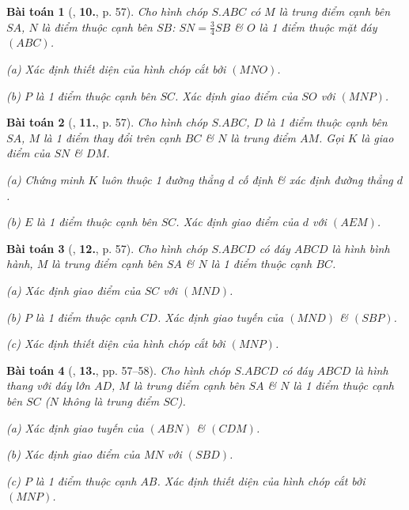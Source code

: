 \documentclass{article}
\numberwithin{equation}{section}
\newtheorem{baitoan}{Bài toán}[section]
\begin{document}
\begin{baitoan}[\cite{TL_chuyen_Toan_Hinh_Hoc_11}, \textbf{10.}, p. 57]
	Cho hình chóp $S.ABC$ có $M$ là trung điểm cạnh bên $SA$, $N$ là điểm thuộc cạnh bên $SB$: $SN = \frac{3}{4}SB$ \& $O$ là 1 điểm thuộc mặt đáy $(ABC)$.
	\begin{enumerate*}
		\item[(a)] Xác định thiết diện của hình chóp cắt bởi $(MNO)$.
		\item[(b)] $P$ là 1 điểm thuộc cạnh bên $SC$. Xác định giao điểm của $SO$ với $(MNP)$.
	\end{enumerate*}
\end{baitoan}

\begin{baitoan}[\cite{TL_chuyen_Toan_Hinh_Hoc_11}, \textbf{11.}, p. 57]
	Cho hình chóp $S.ABC$, $D$ là 1 điểm thuộc cạnh bên $SA$, $M$ là 1 điểm thay đổi trên cạnh $BC$ \& $N$ là trung điểm $AM$. Gọi $K$ là giao điểm của $SN$ \& $DM$.
	\begin{enumerate*}
		\item[(a)] Chứng minh $K$ luôn thuộc 1 đường thẳng $d$ cố định \& xác định đường thẳng $d$.
		\item[(b)] $E$ là 1 điểm thuộc cạnh bên $SC$. Xác định giao điểm của $d$ với $(AEM)$.
	\end{enumerate*}
\end{baitoan}

\begin{baitoan}[\cite{TL_chuyen_Toan_Hinh_Hoc_11}, \textbf{12.}, p. 57]
	Cho hình chóp $S.ABCD$ có đáy $ABCD$ là hình bình hành, $M$ là trung điểm cạnh bên $SA$ \& $N$ là 1 điểm thuộc cạnh $BC$.
	\begin{enumerate*}
		\item[(a)] Xác định giao điểm của $SC$ với $(MND)$.
		\item[(b)] $P$ là 1 điểm thuộc cạnh $CD$. Xác định giao tuyến của $(MND)$ \& $(SBP)$.
		\item[(c)] Xác định thiết diện của hình chóp cắt bởi $(MNP)$.
	\end{enumerate*}
\end{baitoan}

\begin{baitoan}[\cite{TL_chuyen_Toan_Hinh_Hoc_11}, \textbf{13.}, pp. 57--58]
	Cho hình chóp $S.ABCD$ có đáy $ABCD$ là hình thang với đáy lớn $AD$, $M$ là trung điểm cạnh bên $SA$ \& $N$ là 1 điểm thuộc cạnh bên $SC$ ($N$ không là trung điểm $SC$).
	\begin{enumerate*}
		\item[(a)] Xác định giao tuyến của $(ABN)$ \& $(CDM)$.
		\item[(b)] Xác định giao điểm của $MN$ với $(SBD)$.
		\item[(c)] $P$ là 1 điểm thuộc cạnh $AB$. Xác định thiết diện của hình chóp cắt bởi $(MNP)$.
	\end{enumerate*}
\end{baitoan}
\end{document}
